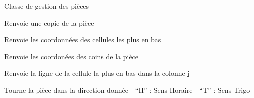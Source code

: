 \documentclass[letterpaper,10pt,french]{sphinxmanual}
\begin{document}
\begin{fulllineitems}
\label{\detokenize{index:tetramino.Tetramino}}
Classe de gestion des pièces

\begin{fulllineitems}
\label{\detokenize{index:tetramino.Tetramino.copy}}
Renvoie une copie de la pièce

\end{fulllineitems}


\begin{fulllineitems}
\label{\detokenize{index:tetramino.Tetramino.getBottomCells}}
Renvoie les coordonnées des cellules les plus en bas

\end{fulllineitems}


\begin{fulllineitems}
\label{\detokenize{index:tetramino.Tetramino.getCorners}}
Renvoie les coordonées des coins de la pièce

\end{fulllineitems}


\begin{fulllineitems}
\label{\detokenize{index:tetramino.Tetramino.getLowerCell}}
Renvoie la ligne de la cellule la plus en bas dans la colonne j

\end{fulllineitems}


\begin{fulllineitems}
\label{\detokenize{index:tetramino.Tetramino.rotate}}
Tourne la pièce dans la direction donnée 
- “H” : Sens Horaire
- “T” : Sens Trigo

\end{fulllineitems}


\end{fulllineitems}
\end{document}
